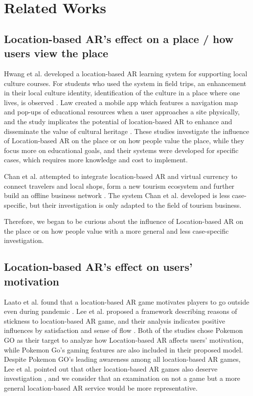 \chapter{Related Works} \label{ch:3}

\section{Location-based AR's effect on a place / how users view the place}
Hwang et al. developed a location-based AR learning system for supporting local culture courses.
For students who used the system in field trips, an enhancement in their local culture identity,
identification of the culture in a place where one lives, is observed \cite{hwang_chang_chen_chen_2017}.
Law created a mobile app which features a navigation map and pop-ups of educational resources when a user approaches a site physically,
and the study implicates the potential of location-based AR to enhance and disseminate the value of cultural heritage \cite{law_2018}.
These studies investigate the influence of Location-based AR on the place or on how people value the place,
while they focus more on educational goals, and their systems were developed for specific cases, which requires more knowledge and cost to implement.

Chan et al. attempted to integrate location-based AR and virtual currency to connect travelers and local shops,
form a new tourism ecosystem and further build an offline business network \cite{chan_lin_wang_lu_hsu_2017}.
The system Chan et al. developed is less case-specific, but their investigation is only adapted to the field of tourism business.

Therefore, we began to be curious about the influence of Location-based AR on the place or on how people value with a more general and less case-specific investigation.

\section{Location-based AR's effect on users' motivation}
Laato et al. found that a location-based AR game motivates players to go outside even during pandemic \cite{laato_islam_laine_2020}.
Lee et al. proposed a framework describing reasons of stickness to location-based AR game,
and their analysis indicates positive influences by satisfaction and sense of flow \cite{lee_chiang_hsiao_2018}.
Both of the studies chose Pokemon GO as their target to analyze how Location-based AR affects users' motivation,
while Pokemon Go's gaming features are also included in their proposed model.
Despite Pokemon GO's leading awareness among all location-based AR games,
Lee et al. pointed out that other location-based AR games also deserve investigation \cite{lee_chiang_hsiao_2018},
and we consider that an examination on not a game but a more general location-based AR service would be more representative.

